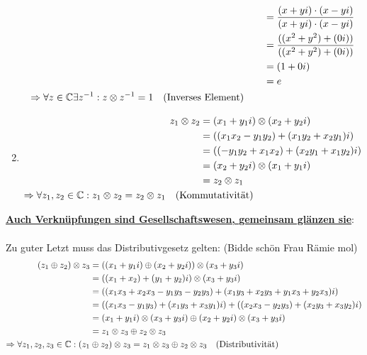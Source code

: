 \documentclass[main.tex]{subfiles}
\begin{document}
\begin{Beweis}
\begin{enumerate}[1)]
\begin{align*}
								  			  	   &= \dfrac{(x + yi) \cdot (x - yi)}{(x + yi) \cdot (x - yi)} \\
												   &= \dfrac{((x^2 + y^2) + (0i))}{((x^2 + y^2) + (0i))} \\
											  	   &= (1 + 0i) \\
											  	   &= e \\
						\Rightarrow \forall z \in \mathbb{C} \exists z^{-1}: z \otimes z^{-1} = 1 \quad \text{(Inverses Element)} \qquad &
	  			  \end{align*}
			\item \begin{align*}
						z_1 \otimes z_2 &= (x_1 + y_1i) \otimes (x_2 + y_2i) \\
									    &= ((x_1x_2 - y_1y_2) + (x_1y_2 + x_2y_1)i) \\
									    &= ((- y_1y_2 + x_1x_2) + (x_2y_1 + x_1y_2)i) \\
									    &= (x_2 + y_2i) \otimes (x_1 + y_1i) \\
									    &= z_2 \otimes z_1 \\
						\Rightarrow \forall z_1, z_2 \in \mathbb{C}: z_1 \otimes z_2 = z_2 \otimes z_1 \quad \text{(Kom}&\text{mutativität)}
				  \end{align*}
		\end{enumerate}
		\newpage
		\underline{\textbf{Auch Verknüpfungen sind Gesellschaftswesen, gemeinsam glänzen sie}}:
		\paragraph{} Zu guter Letzt muss das Distributivgesetz gelten: (Bidde schön Frau Rämie mol)
			\begin{align*}
				(z_1 \oplus z_2) \otimes z_3 &= ((x_1 + y_1i) \oplus (x_2 + y_2i)) \otimes (x_3 + y_3i) \\
											 &= ((x_1 + x_2) +  (y_1 + y_2)i) \otimes (x_3 + y_3i) \\
											 &= ((x_1x_3 + x_2x_3 - y_1y_3 - y_2y_3) + (x_1y_3 + x_2y_3 + y_1x_3 + y_2x_3)i) \\
											 &= ((x_1x_3 - y_1y_3) + (x_1y_3 + x_3y_1)i) + ((x_2x_3 - y_2y_3) + (x_2y_3 + x_3y_2)i) \\
											 &= (x_1 + y_1i) \otimes (x_3 + y_3i) \oplus (x_2 + y_2i) \otimes (x_3 + y_3i) \\
											 &= z_1 \otimes z_3 \oplus z_2 \otimes z_3 \\
			\Rightarrow \forall z_1, z_2, z_3 \in \mathbb{C}: (z_1 &\oplus z_2) \otimes z_3 = z_1 \otimes z_3 \oplus z_2 \otimes z_3 \quad \text{(Distributivität)}
			\end{align*}
	\end{Beweis}
\end{document}
